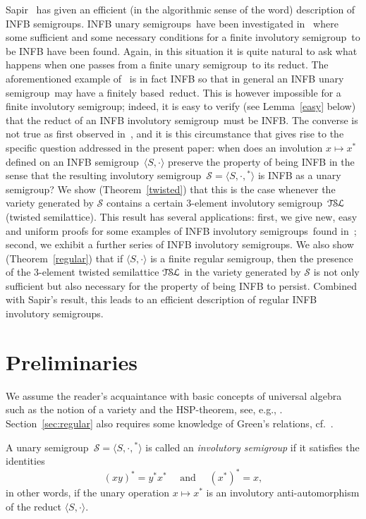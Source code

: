 \documentclass[11pt,reqno]{amsart}
\newcommand{\sgp}{semi\-group}
\newcommand{\sgps}{semi\-groups}
\newcommand{\is}{involutory semi\-group}
\newcommand{\iss}{involutory semi\-groups}
\newcommand{\fis}{finite involutory semi\-group}
\newcommand{\fus}{finite unary \sgp}
\newcommand{\fb}{finitely based}
\newcommand{\TSL}{\ensuremath{\mathcal{T\kern-.5pt S\kern-.5pt L}}}
\begin{document}
Sapir~\cite{Sapir:1987} has given an efficient (in the algorithmic sense of the word) description of INFB \sgps. INFB unary \sgps\ have
been investigated in~\cite{Dolinka:2010,ADV:2012} where some sufficient and some necessary conditions for a \fis\ to be INFB have been
found. Again, in this situation it is quite natural to ask what happens when one passes from a \fus\ to its reduct. The aforementioned
example of~\cite{Lawrence&Willard:1998} is in fact INFB so that in general an INFB unary \sgp\ may have a \fb\ reduct. This is however
impossible for a \fis; indeed, it is easy to verify (see Lemma~\ref{easy} below) that the reduct of an INFB \is\ must be INFB. The converse
is not true as first observed in~\cite{Sapir:1993}, and it is this circumstance that gives rise to the specific question addressed in the
present paper: when does an involution $x\mapsto x^*$ defined on an INFB \sgp\ $\langle S,\cdot\rangle$ preserve the property of being INFB
in the sense that the resulting \is\ $\mathcal{S}=\langle S,\cdot,{}^*\rangle$ is INFB as a unary \sgp?  We show (Theorem~\ref{twisted})
that this is the case whenever the variety generated by $\mathcal{S}$ contains a certain 3-element \is\ $\TSL$ (twisted semilattice). This
result has several applications: first, we give new, easy and uniform proofs for some examples of INFB \iss\ found in~\cite{ADV:2012};
second, we exhibit a further series of INFB \iss. We also show (Theorem~\ref{regular}) that if $\langle S,\cdot\rangle$ is a finite regular
\sgp, then the presence of the 3-element twisted semilattice $\TSL$ in the variety generated by $\mathcal{S}$ is not only sufficient but
also necessary for the property of being INFB to persist. Combined with Sapir's result, this leads to an efficient description of regular
INFB \iss.

\section{Preliminaries}
\label{sec:preliminaries}

We assume the reader's acquaintance with basic concepts of universal algebra such as the notion of a variety and the HSP-theorem, see,
e.g., \cite[Chapter~II]{BuSa81}. Section~\ref{sec:regular} also requires some knowledge of Green's relations, cf.~\cite[Chapter~2]{how}.

A unary \sgp\ $\mathcal{S}=\langle S,\cdot,{}^*\rangle$ is called an \emph{\is} if it satisfies the identities
\begin{equation}
\label{eq:invlution} (xy)^*=y^*x^* \quad \text{ and  }\quad (x^*)^*=x,
\end{equation}
in other words, if the unary operation $x\mapsto x^*$ is an involutory anti-automorphism of the reduct $\langle S,\cdot\rangle$.
\end{document}

